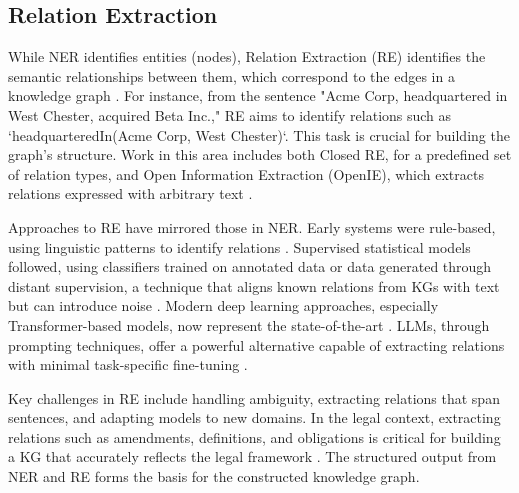 \subsection{Relation Extraction}
While NER identifies entities (nodes), Relation Extraction (RE) identifies the semantic relationships between them, which correspond to the edges in a knowledge graph \parencite{RefWorks:RefID:118-ji2022survey, RefWorks:RefID:57-carbonell2020named}. For instance, from the sentence "Acme Corp, headquartered in West Chester, acquired Beta Inc.," RE aims to identify relations such as `headquarteredIn(Acme Corp, West Chester)`. This task is crucial for building the graph's structure. Work in this area includes both Closed RE, for a predefined set of relation types, and Open Information Extraction (OpenIE), which extracts relations expressed with arbitrary text \parencite{RefWorks:RefID:134-etzioni2008acm}.

Approaches to RE have mirrored those in NER. Early systems were rule-based, using linguistic patterns to identify relations \parencite{RefWorks:RefID:136-hearst1992automatic}. Supervised statistical models followed, using classifiers trained on annotated data or data generated through distant supervision, a technique that aligns known relations from KGs with text but can introduce noise \parencite{RefWorks:RefID:139-kambhatla2004combining, RefWorks:RefID:140-mintz2009distant}. Modern deep learning approaches, especially Transformer-based models, now represent the state-of-the-art \parencite{RefWorks:RefID:141-kumar2017survey, RefWorks:RefID:142-wu2019enriching}. LLMs, through prompting techniques, offer a powerful alternative capable of extracting relations with minimal task-specific fine-tuning \parencite{RefWorks:RefID:143-chia2022relation}.

Key challenges in RE include handling ambiguity, extracting relations that span sentences, and adapting models to new domains. In the legal context, extracting relations such as amendments, definitions, and obligations is critical for building a KG that accurately reflects the legal framework \parencite{RefWorks:RefID:77-tauqeer2022automated, RefWorks:RefID:76-dhani2021similar}. The structured output from NER and RE forms the basis for the constructed knowledge graph.

